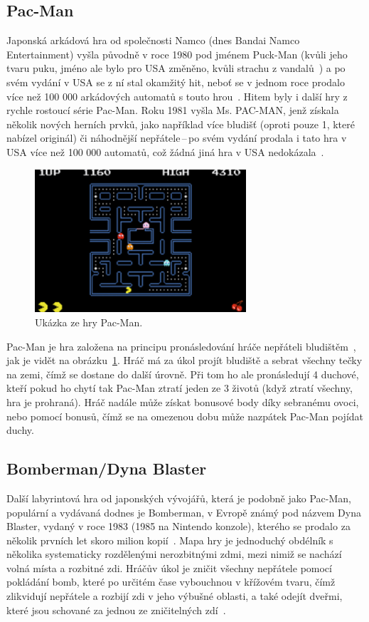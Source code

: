 \subsection*{Pac-Man}
Japonská arkádová hra od společnosti Namco (dnes Bandai Namco Entertainment) vyšla původně v roce 1980 pod jménem Puck-Man (kvůli jeho tvaru puku, jméno ale bylo pro USA změněno, kvůli strachu z vandalů~\cite{kent2010ultimate}) a po svém vydání v USA se z ní stal okamžitý hit, neboť se v jednom roce prodalo více než 100 000 arkádových automatů s touto hrou~\cite{PACMAN}. Hitem byly i další hry z rychle rostoucí série Pac-Man. Roku 1981 vyšla Ms. PAC-MAN, jenž získala několik nových herních prvků, jako například více bludišť (oproti pouze 1, které nabízel originál) či náhodnější nepřátele\,--\,po svém vydání prodala i tato hra v USA více než 100 000 automatů, což žádná jiná hra v USA nedokázala~\cite{kent2010ultimate}.

\begin{figure}[hb]
	\centering
	\includegraphics[width=0.7\textwidth]{obrazky-figures/ch2/pacman.png}
	\caption{Ukázka ze hry Pac-Man.~\cite{von2007space}}
	\label{fig:pacman}
\end{figure}

Pac-Man je hra založena na principu pronásledování hráče nepřáteli bludištěm~\cite{kent2010ultimate}, jak je vidět na obrázku~\ref{fig:pacman}. Hráč má za úkol projít bludiště a sebrat všechny tečky na zemi, čímž se dostane do další úrovně. Při tom ho ale pronásledují 4 duchové, kteří pokud ho chytí tak Pac-Man ztratí jeden ze 3 životů (když ztratí všechny, hra je prohraná). Hráč nadále může získat bonusové body díky sebranému ovoci, nebo pomocí bonusů, čímž se na omezenou dobu může nazpátek Pac-Man pojídat duchy.

\subsection*{Bomberman/Dyna Blaster}
Další labyrintová hra od japonských vývojářů, která je podobně jako Pac-Man, populární a vydávaná dodnes je Bomberman, v Evropě známý pod názvem Dyna Blaster, vydaný v roce 1983 (1985 na Nintendo konzole), kterého se prodalo za několik prvních let skoro milion kopií~\cite{Bomberman}. 
Mapa hry je jednoduchý obdélník s několika systematicky rozdělenými nerozbitnými zdmi, mezi nimiž se nachází volná místa a rozbitné zdi. Hráčův úkol je zničit všechny nepřátele pomocí pokládání bomb, které po určitém čase vybouchnou v křížovém tvaru, čímž zlikvidují nepřátele a rozbijí zdi v jeho výbušné oblasti, a také odejít dveřmi, které jsou schované za jednou ze zničitelných zdí~\cite{Bomberman}. 

